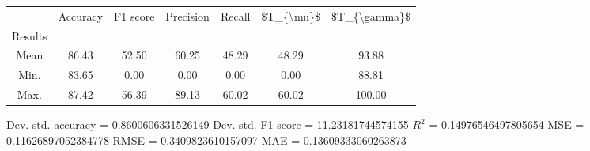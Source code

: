 \begin{tabular}{|c|c|c|c|c|c|c|}
\toprule
{} &  Accuracy &  F1 score &  Precision &  Recall &  \$T\_\{\textbackslash mu\}\$ &  \$T\_\{\textbackslash gamma\}\$ \\
Results &           &           &            &         &            &               \\
\hline
Mean    &     86.43 &     52.50 &      60.25 &   48.29 &      48.29 &         93.88 \\
Min.    &     83.65 &      0.00 &       0.00 &    0.00 &       0.00 &         88.81 \\
Max.    &     87.42 &     56.39 &      89.13 &   60.02 &      60.02 &        100.00 \\
\bottomrule
\end{tabular}

 Dev. std. accuracy = 0.8600606331526149
 Dev. std. F1-score = 11.23181744574155
 $R^2$ = 0.14976546497805654
 MSE = 0.11626897052384778
 RMSE = 0.3409823610157097
 MAE = 0.13609333060263873